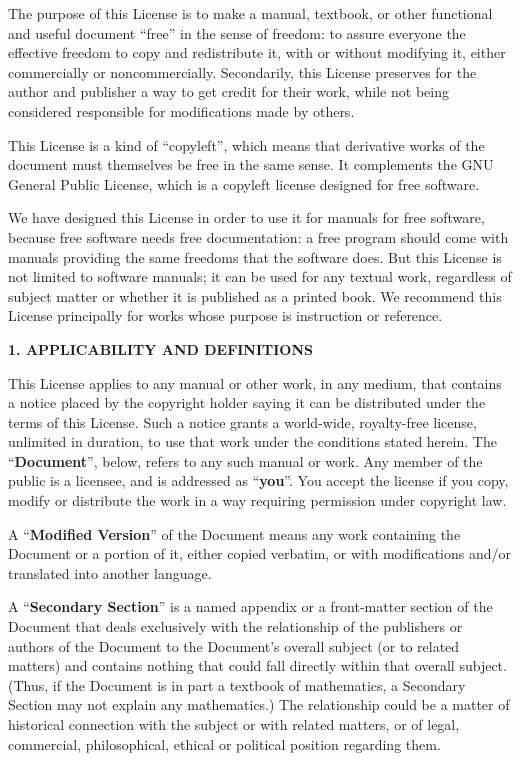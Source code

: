 \documentclass[a4paper]{book}
\begin{document}
The purpose of this License is to make a manual, textbook, or other
functional and useful document ``free'' in the sense of freedom: to
assure everyone the effective freedom to copy and redistribute it,
with or without modifying it, either commercially or noncommercially.
Secondarily, this License preserves for the author and publisher a way
to get credit for their work, while not being considered responsible
for modifications made by others.

This License is a kind of ``copyleft'', which means that derivative
works of the document must themselves be free in the same sense.  It
complements the GNU General Public License, which is a copyleft
license designed for free software.

We have designed this License in order to use it for manuals for free
software, because free software needs free documentation: a free
program should come with manuals providing the same freedoms that the
software does.  But this License is not limited to software manuals;
it can be used for any textual work, regardless of subject matter or
whether it is published as a printed book.  We recommend this License
principally for works whose purpose is instruction or reference.


\begin{center}
{\Large\bf 1. APPLICABILITY AND DEFINITIONS\par}
\end{center}

This License applies to any manual or other work, in any medium, that
contains a notice placed by the copyright holder saying it can be
distributed under the terms of this License.  Such a notice grants a
world-wide, royalty-free license, unlimited in duration, to use that
work under the conditions stated herein.  The ``\textbf{Document}'', below,
refers to any such manual or work.  Any member of the public is a
licensee, and is addressed as ``\textbf{you}''.  You accept the license if you
copy, modify or distribute the work in a way requiring permission
under copyright law.

A ``\textbf{Modified Version}'' of the Document means any work containing the
Document or a portion of it, either copied verbatim, or with
modifications and/or translated into another language.

A ``\textbf{Secondary Section}'' is a named appendix or a front-matter section of
the Document that deals exclusively with the relationship of the
publishers or authors of the Document to the Document's overall subject
(or to related matters) and contains nothing that could fall directly
within that overall subject.  (Thus, if the Document is in part a
textbook of mathematics, a Secondary Section may not explain any
mathematics.)  The relationship could be a matter of historical
connection with the subject or with related matters, or of legal,
commercial, philosophical, ethical or political position regarding
them.
\end{document}
